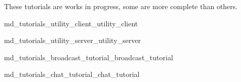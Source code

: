 These tutorials are works in progress, some are more complete than others.


\begin{DoxyItemize}
\item md\+\_\+tutorials\+\_\+utility\+\_\+client\+\_\+utility\+\_\+client
\item md\+\_\+tutorials\+\_\+utility\+\_\+server\+\_\+utility\+\_\+server
\item md\+\_\+tutorials\+\_\+broadcast\+\_\+tutorial\+\_\+broadcast\+\_\+tutorial
\item md\+\_\+tutorials\+\_\+chat\+\_\+tutorial\+\_\+chat\+\_\+tutorial 
\end{DoxyItemize}